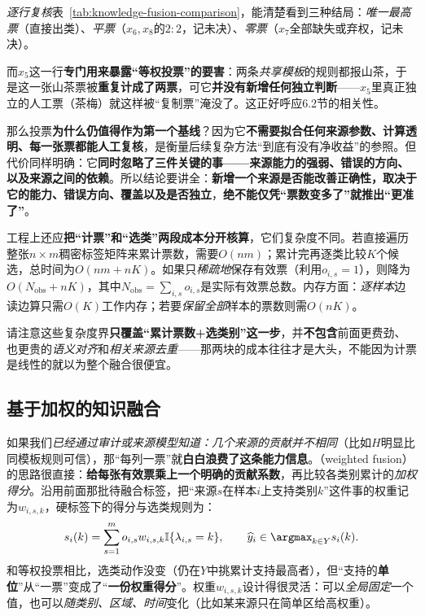 \emph{逐行复核}表~\ref{tab:knowledge-fusion-comparison}，能清楚看到三种结局：\emph{唯一最高票}（直接出类）、\emph{平票}（$x_6,x_8$的$2:2$，记未决）、\emph{零票}（$x_7$全部缺失或弃权，记未决）。

而$x_5$这一行\textbf{专门用来暴露“等权投票”的要害}：两条\emph{共享模板}的规则都报山茶，于是这一张山茶票被\textbf{重复计成了两票}，可它\textbf{并没有新增任何独立判断}——$x_5$里真正独立的人工票（茶梅）就这样被“复制票”淹没了。这正好呼应6.2节的相关性。

那么投票\textbf{为什么仍值得作为第一个基线}？因为它\textbf{不需要拟合任何来源参数、计算透明、每一张票都能人工复核}，是衡量后续复杂方法“到底有没有净收益”的参照。但代价同样明确：它\textbf{同时忽略了三件关键的事——来源能力的强弱、错误的方向、以及来源之间的依赖}。所以结论要讲全：\textbf{新增一个来源是否能改善正确性，取决于它的能力、错误方向、覆盖以及是否独立}，\textbf{绝不能仅凭“票数变多了”就推出“更准了”}。

工程上还应\textbf{把“计票”和“选类”两段成本分开核算}，它们复杂度不同。若直接遍历整张$n\times m$稠密标签矩阵来累计票数，需要$O(nm)$；累计完再逐类比较$K$个候选，总时间为$O(nm+nK)$。如果只\emph{稀疏地}保存有效票（利用$o_{i,s}=1$），则降为$O(N_{\mathrm{obs}}+nK)$，其中$N_{\mathrm{obs}}=\sum_{i,s}o_{i,s}$是实际有效票总数。内存方面：\emph{逐样本}边读边算只需$O(K)$工作内存；若要\emph{保留全部}样本的票数则需$O(nK)$。

请注意这些复杂度界\textbf{只覆盖“累计票数+选类别”这一步}，并\textbf{不包含}前面更费劲、也更贵的\emph{语义对齐}和\emph{相关来源去重}——那两块的成本往往才是大头，不能因为计票是线性的就以为整个融合很便宜。

\subsection{基于加权的知识融合}
\label{sec:knowledge-fusion-weighting}

如果我们\emph{已经通过审计或来源模型知道：几个来源的贡献并不相同}（比如$H$明显比同模板规则可信），那“每列一票”就\textbf{白白浪费了这条能力信息}。（weighted fusion）的思路很直接：\textbf{给每张有效票乘上一个明确的贡献系数}，再比较各类别累计的\emph{加权得分}。沿用前面那批待融合标签，把“来源$s$在样本$i$上支持类别$k$”这件事的权重记为$w_{i,s,k}$，硬标签下的得分与选类规则为：
\begin{equation}
  s_i(k)
  =\sum_{s=1}^{m}o_{i,s}w_{i,s,k}
    \mathbb{I}\{\lambda_{i,s}=k\},
  \qquad
  \widehat y_i\in\argmax_{k\in Y}s_i(k).
  \label{eq:knowledge-fusion-weighted-vote}
\end{equation}
和等权投票相比，选类动作没变（仍在$Y$中挑累计支持最高者），但“支持的\textbf{单位}”从“一票”变成了“\textbf{一份权重得分}”。权重$w_{i,s,k}$设计得很灵活：可以\emph{全局固定}一个值，也可以\emph{随类别、区域、时间}变化（比如某来源只在简单区给高权重）。

